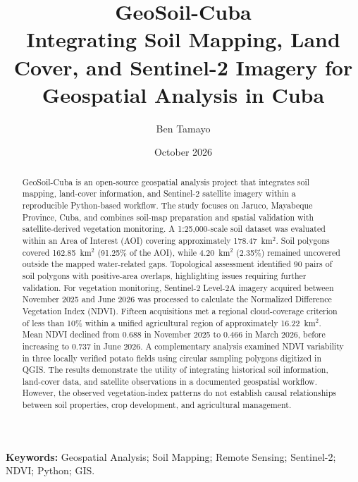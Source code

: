 \documentclass[11pt,a4paper]{article}
\title{
	\textbf{GeoSoil-Cuba}\\[0.3cm]
	\large
	Integrating Soil Mapping, Land Cover, and
	Sentinel-2 Imagery for Geospatial Analysis in Cuba
}
\author{Ben Tamayo}
\date{October 2026}
\begin{document}
	
	\maketitle
	
\begin{abstract}
	
	GeoSoil-Cuba is an open-source geospatial analysis project
	that integrates soil mapping, land-cover information, and
	Sentinel-2 satellite imagery within a reproducible
	Python-based workflow. The study focuses on Jaruco,
	Mayabeque Province, Cuba, and combines soil-map preparation
	and spatial validation with satellite-derived vegetation
	monitoring. A 1:25,000-scale soil dataset was evaluated
	within an Area of Interest (AOI) covering approximately
	178.47~km$^2$. Soil polygons covered 162.85~km$^2$
	(91.25\% of the AOI), while 4.20~km$^2$ (2.35\%) remained
	uncovered outside the mapped water-related gaps. Topological
	assessment identified 90 pairs of soil polygons with
	positive-area overlaps, highlighting issues requiring
	further validation. For vegetation monitoring, Sentinel-2
	Level-2A imagery acquired between November 2025 and June
	2026 was processed to calculate the Normalized Difference
	Vegetation Index (NDVI). Fifteen acquisitions met a
	regional cloud-coverage criterion of less than 10\% within
	a unified agricultural region of approximately 16.22~km$^2$.
	Mean NDVI declined from 0.688 in November 2025 to 0.466
	in March 2026, before increasing to 0.737 in June 2026.
	A complementary analysis examined NDVI variability in
	three locally verified potato fields using circular
	sampling polygons digitized in QGIS. The results
	demonstrate the utility of integrating historical soil
	information, land-cover data, and satellite observations
	in a documented geospatial workflow. However, the observed
	vegetation-index patterns do not establish causal
	relationships between soil properties, crop development,
	and agricultural management.
	
\end{abstract}
	
	\noindent
	\textbf{Keywords:}
	Geospatial Analysis;
	Soil Mapping;
	Remote Sensing;
	Sentinel-2;
	NDVI;
	Python;
	GIS.
	
	\vspace{0.5cm}
	
	
	
	
	
	
	
	
	
\end{document}
